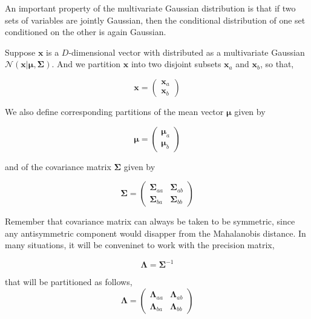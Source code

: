 
An important property of the multivariate Gaussian distribution is that if two sets of variables are jointly Gaussian, then the conditional distribution of one set conditioned on the other is again Gaussian. 

\vspace{0.3cm}

Suppose $\mathbf{x}$ is a $D$-dimensional vector with distributed as a multivariate Gaussian $\mathcal{N}(\mathbf{x}|\bm{\mu},\bm{\Sigma})$.
And we partition $\mathbf{x}$ into two disjoint subsets $\mathbf{x}_a$ and $\mathbf{x}_b$, so that,

\begin{equation}\label{eq:partitioned_x}
\mathbf{x} = 
\begin{pmatrix}
 \mathbf{x}_a \\
 \mathbf{x}_b
\end{pmatrix}
\end{equation}

We also define corresponding partitions of the mean vector $\bm{\mu}$ given by


\begin{equation}\label{eq:partitioned_mu}
\bm{\mu} = 
\begin{pmatrix}
 \bm{\mu}_a \\
 \bm{\mu}_b
\end{pmatrix}
\end{equation}

and of the covariance matrix $\bm{\Sigma}$ given by

\begin{equation}\label{eq:partitioned_Sigma}
\bm{\Sigma} = 
\begin{pmatrix}
 \bm{\Sigma}_{aa} & \bm{\Sigma}_{ab} \\
 \bm{\Sigma}_{ba} & \bm{\Sigma}_{bb}
\end{pmatrix}
\end{equation}

Remember that covariance matrix can always be taken to be symmetric, since any antisymmetric component would disapper from the Mahalanobis distance.
In many situations, it will be conveninet to work with the precision matrix,

\begin{equation}
 \bm{\Lambda} = \bm{\Sigma}^{-1}
\end{equation}

that will be partitioned as follows,
\begin{equation}\label{eq:partitioned_Lambda}
\bm{\Lambda} = 
\begin{pmatrix}
 \bm{\Lambda}_{aa} & \bm{\Lambda}_{ab} \\
 \bm{\Lambda}_{ba} & \bm{\Lambda}_{bb}
\end{pmatrix}
\end{equation}

